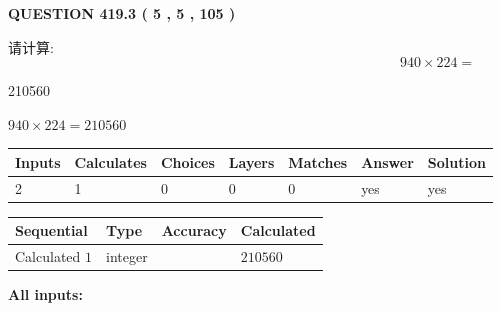 \documentclass{ctexart}
\begin{document}
{\textbf{\Large{QUESTION
419.3 
 ( 5 , 5 , 105 )
}}}
  
  
 
请计算:
\begin{equation}
940  \times    %
224 = \nonumber
\end{equation}
 
 
 
\noindent{}
 
 

210560
 
 
\noindent{}
 
 

 
 
 
\noindent{}
 
 

$ %
940 \times  %
224=   %
210560$
 
 
\noindent{}
 
 

 
   
   
   
   
\noindent\begin{tabular}{|l|l|l|l|l|l|l|}
 \hline
Inputs & Calculates & Choices & Layers & Matches & Answer & Solution \\ \hline
 2  & 
 1  & 
 0
  & 
 0  & 
 0  & 
  yes & 
  yes 
  \\ \hline
 \end{tabular}
   
   
   
   
\noindent{}
   
   
  
  
\noindent\begin{tabular}{|l|l|l|l|}
\hline
 Sequential & Type & Accuracy & Calculated \\ 
\hline
 
 
  Calculated $  1 $ & integer &  & 
  $ 210560 $ 
 \\  \hline  
 \end{tabular}
   
   
   
   
\noindent\vspace{0.1in}\hspace{-0.08in} {\textbf{\Large{All inputs: }}}
   
\end{document}
